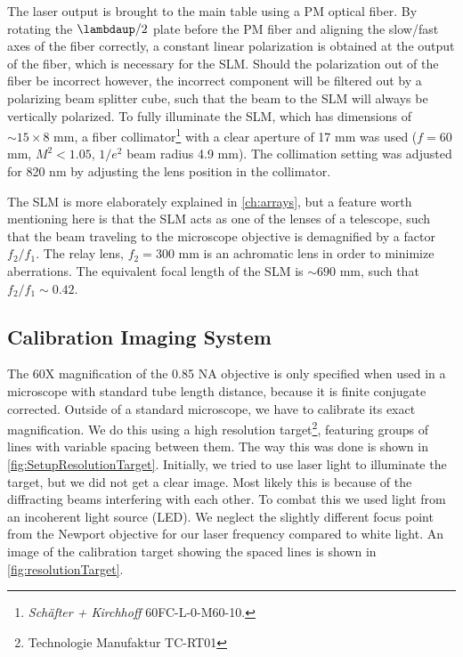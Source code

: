 The laser output is brought to the main table using a \ac{PM} optical fiber.
By rotating the $\lambdaup/2$ plate before the PM fiber and aligning the slow/fast axes of the fiber correctly, a constant linear polarization is obtained at the output of the fiber, which is necessary for the \ac{SLM}.
Should the polarization out of the fiber be incorrect however, the incorrect component will be filtered out by a polarizing beam splitter cube, such that the beam to the SLM will always be vertically polarized.
To fully illuminate the SLM, which has dimensions of $\sim 15 \times 8$ mm, a fiber collimator\footnote{\textit{Schäfter + Kirchhoff} 60FC-L-0-M60-10.} with a clear aperture of 17 mm was used ($f=60$ mm, $M^2 < 1.05$, $1/e^2$ beam radius 4.9 mm).
The collimation setting was adjusted for 820 nm by adjusting the lens position in the collimator.

The SLM is more elaborately explained in \cref{ch:arrays}, but a feature worth mentioning here is that the SLM acts as one of the lenses of a telescope, such that the beam traveling to the microscope objective is demagnified by a factor $f_2/f_1$.
The relay lens, $f_2=300$ mm is an achromatic lens in order to minimize aberrations.
The equivalent focal length of the SLM is $\sim 690$ mm, such that $f_2/f_1 \sim 0.42$.


\subsection{Calibration Imaging System}\label{subsec:CameraCalibration}

The 60X magnification of the 0.85 NA objective is only specified when used in a microscope with standard tube length distance, because it is finite conjugate corrected.
Outside of a standard microscope, we have to calibrate its exact magnification.
We do this using a high resolution target\footnote{Technologie Manufaktur TC-RT01}, featuring groups of lines with variable spacing between them. 
The way this was done is shown in \cref{fig:SetupResolutionTarget}.
Initially, we tried to use laser light to illuminate the target, but we did not get a clear image. 
Most likely this is because of the diffracting beams interfering with each other. 
To combat this we used light from an incoherent light source (\ac{LED}). 
We neglect the slightly different focus point from the Newport objective for our laser frequency compared to white light. 
An image of the calibration target showing the spaced lines is shown in \cref{fig:resolutionTarget}.

